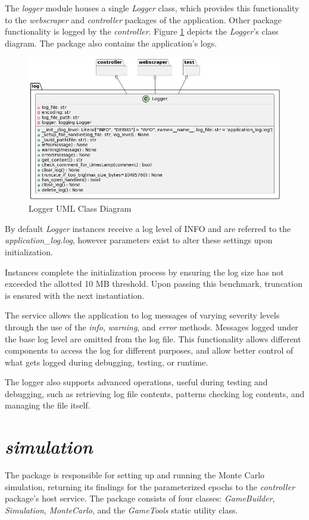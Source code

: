 \documentclass{thesis-ekf}
\theoremstyle{definition}
\theoremstyle{remark}
\begin{document}
The \emph{logger} module houses a single \emph{Logger} class, which provides this functionality to the \emph{webscraper} and \emph{controller} packages of the application. Other package functionality is logged by the \emph{controller}. Figure \ref{img-logger-class} depicts the \emph{Logger}'s class diagram. The package also contains the application's logs.

\begin{figure}[th!]
	\centering
	\includegraphics[width=0.8\linewidth]{img/class/logger}
	\caption{Logger UML Class Diagram}
	\label{img-logger-class}
\end{figure}

By default \emph{Logger} instances receive a log level of INFO and are referred to the \emph{application\_log.log}, however parameters exist to alter these settings upon initialization. 

Instances complete the initialization process by ensuring the log size has not exceeded the allotted 10 MB threshold. Upon passing this benchmark, truncation is ensured with the next instantiation.

The service allows the application to log messages of varying severity levels through the use of the \emph{info}, \emph{warning}, and \emph{error} methods. Messages logged under the base log level are omitted from the log file. This functionality allows different components to access the log for different purposes, and allow better control of what gets logged during debugging, testing, or runtime.

The logger also supports advanced operations, useful during testing and debugging, such as retrieving log file contents, patterns checking log contents, and managing the file itself.


\section{\emph{simulation}} \label{sec-simulation}
The package is responsible for setting up and running the Monte Carlo simulation, returning its findings for the parameterized epochs to the \emph{controller} package's host service. The package consists of four classes: \emph{GameBuilder}, \emph{Simulation}, \emph{MonteCarlo}, and the \emph{GameTools} static utility class.
\end{document}
